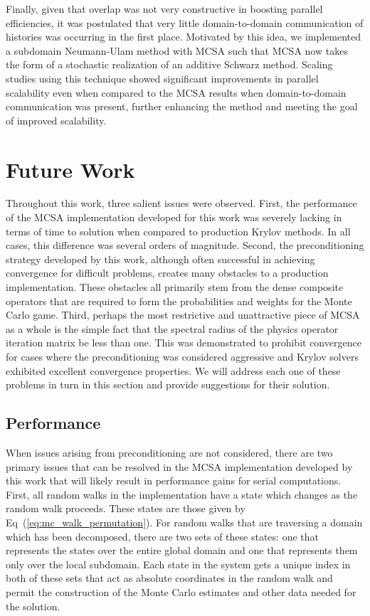 Finally, given that overlap was not very constructive in boosting
parallel efficiencies, it was postulated that very little
domain-to-domain communication of histories was occurring in the first
place. Motivated by this idea, we implemented a subdomain Neumann-Ulam
method with MCSA such that MCSA now takes the form of a stochastic
realization of an additive Schwarz method. Scaling studies using this
technique showed significant improvements in parallel scalability even
when compared to the MCSA results when domain-to-domain communication
was present, further enhancing the method and meeting the goal of
improved scalability.

\section{Future Work\ }
\label{sec:future_work}

Throughout this work, three salient issues were observed. First, the
performance of the MCSA implementation developed for this work was
severely lacking in terms of time to solution when compared to
production Krylov methods. In all cases, this difference was several
orders of magnitude. Second, the preconditioning strategy developed by
this work, although often successful in achieving convergence for
difficult problems, creates many obstacles to a production
implementation. These obstacles all primarily stem from the dense
composite operators that are required to form the probabilities and
weights for the Monte Carlo game. Third, perhaps the most restrictive
and unattractive piece of MCSA as a whole is the simple fact that the
spectral radius of the physics operator iteration matrix be less than
one. This was demonstrated to prohibit convergence for cases where the
preconditioning was considered aggressive and Krylov solvers exhibited
excellent convergence properties. We will address each one of these
problems in turn in this section and provide suggestions for their
solution.

\subsection{Performance}
\label{subsec:future_performance}
When issues arising from preconditioning are not considered, there are
two primary issues that can be resolved in the MCSA implementation
developed by this work that will likely result in performance gains
for serial computations. First, all random walks in the implementation
have a state which changes as the random walk proceeds. These states
are those given by Eq~(\ref{eq:mc_walk_permutation}). For random walks
that are traversing a domain which has been decomposed, there are two
sets of these states: one that represents the states over the entire
global domain and one that represents them only over the local
subdomain. Each state in the system gets a unique index in both of
these sets that act as absolute coordinates in the random walk and
permit the construction of the Monte Carlo estimates and other data
needed for the solution.

